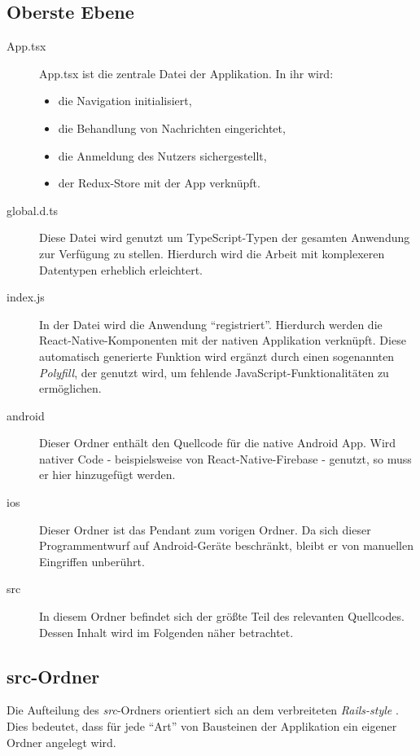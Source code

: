 \subsection{Oberste Ebene}
\begin{description}
    \item[App.tsx]
    App.tsx ist die zentrale Datei der Applikation. In ihr wird:
    \begin{itemize}
        \item die Navigation initialisiert,
        \item die Behandlung von Nachrichten eingerichtet,
        \item die Anmeldung des Nutzers sichergestellt,
        \item der Redux-Store mit der App verknüpft.
    \end{itemize}
    \item[global.d.ts]
    Diese Datei wird genutzt um TypeScript-Typen der gesamten Anwendung zur Verfügung zu stellen.
    Hierdurch wird die Arbeit mit komplexeren Datentypen erheblich erleichtert.
    \item[index.js]
    In der Datei wird die Anwendung \enquote{registriert}.
    Hierdurch werden die React-Native-Komponenten mit der nativen Applikation verknüpft.
    Diese automatisch generierte Funktion wird ergänzt durch einen sogenannten \emph{Polyfill}, der genutzt wird,
    um fehlende JavaScript-Funktionalitäten zu ermöglichen. \cite{undefine14:online}
    \item[android]
    Dieser Ordner enthält den Quellcode für die native Android App.
    Wird nativer Code - beispielsweise von React-Native-Firebase - genutzt,
    so muss er hier hinzugefügt werden.
    \item[ios]
    Dieser Ordner ist das Pendant zum vorigen Ordner.
    Da sich dieser Programmentwurf auf Android-Geräte beschränkt,
    bleibt er von manuellen Eingriffen unberührt.
    \item[src]
    In diesem Ordner befindet sich der größte Teil des relevanten Quellcodes.
    Dessen Inhalt wird im Folgenden näher betrachtet.
\end{description}

\subsection{src-Ordner}
Die Aufteilung des \emph{src}-Ordners orientiert sich an dem verbreiteten \emph{Rails-style} \cite{CodeStru4:online}.
Dies bedeutet, dass für jede \enquote{Art} von Bausteinen der Applikation ein eigener Ordner angelegt wird.

